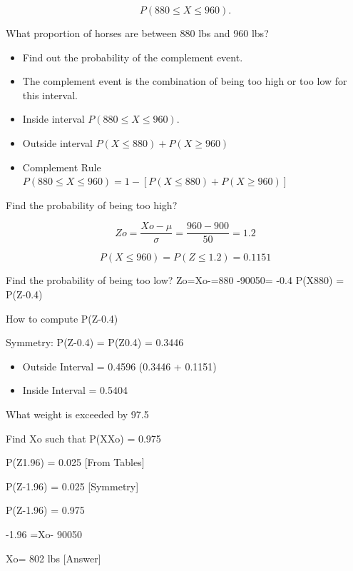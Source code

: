 \documentclass[12pt]{report}
\begin{document}
\[P ( 880 \leq X \leq 960).\]


What proportion of horses are between 880 lbs and 960 lbs?
\begin{itemize}
\item Find out the probability of the complement event.
\item The complement event is the combination of being too high  or too low for this interval.

\item Inside interval $P ( 880 \leq X \leq 960).$

\item Outside interval $P (X \leq 880) + P(X \geq 960)$

\item Complement Rule $P ( 880\leq X \leq 960)  = 1 - [P (X\leq 880) +P(X\geq 960)]$

\end{itemize}



Find the probability of being too high?

\[Zo=\frac{Xo-\mu}{\sigma}= \frac{960 -900}{50}= 1.2\]

\[P(X \leq 960) = P(Z \leq 1.2) = 0.1151\]


Find the probability of being too low?
Zo=Xo-=880 -90050= -0.4 
P(X880) = P(Z-0.4)  

How to compute P(Z-0.4)

Symmetry: 	P(Z-0.4) = P(Z0.4) = 0.3446


\begin{itemize}
\item Outside Interval = 0.4596        (0.3446 +  0.1151)
\item Inside Interval = 0.5404
\end{itemize}



What weight is exceeded by 97.5%

Find Xo  such that P(XXo) = 0.975


P(Z1.96) = 0.025     [From Tables] 

P(Z-1.96) = 0.025  [Symmetry]

P(Z-1.96) = 0.975         

-1.96 =Xo- 90050


Xo= 802 lbs  [Answer]

\end{document}
